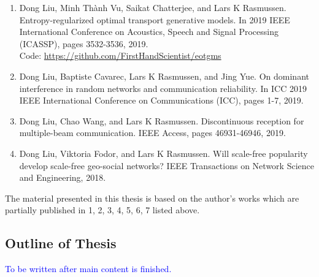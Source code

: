 \begin{enumerate}
\item Dong Liu, Minh Th\`{a}nh Vu, Saikat Chatterjee, and Lars K Rasmussen. Entropy-regularized
  optimal transport generative models. In 2019 IEEE International Conference on Acoustics,
  Speech and Signal Processing (ICASSP), pages 3532-3536, 2019.\\
  Code: \href{https://github.com/FirstHandScientist/eotgms}{https://github.com/FirstHandScientist/eotgms}

\item Dong Liu, Baptiste Cavarec, Lars K Rasmussen, and Jing Yue. On dominant interference in random networks and communication reliability. In ICC 2019 IEEE International Conference on Communications (ICC), pages 1-7, 2019.
  
\item Dong Liu, Chao Wang, and Lars K Rasmussen. Discontinuous reception for multiple-beam communication. IEEE Access, pages 46931-46946, 2019.
  
\item Dong Liu, Viktoria Fodor, and Lars K Rasmussen. Will scale-free popularity develop scale-free geo-social networks? IEEE Transactions on Network Science and Engineering, 2018.
\end{enumerate}
The material presented in this thesis is based on the author's works which are partially published in 1, 2, 3, 4, 5, 6, 7 listed above. 
\subsection{Outline of Thesis}

\textcolor{blue}{To be written after main content is finished.}


